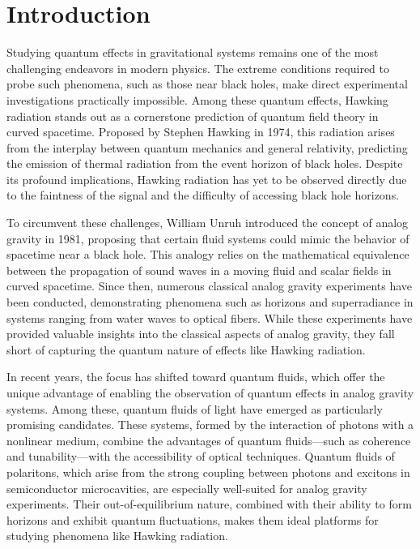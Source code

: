 

\chapter{Introduction}
\label{chap:introduction}

Studying quantum effects in gravitational systems remains one of the most challenging endeavors in modern physics. 
The extreme conditions required to probe such phenomena, such as those near black holes, make direct experimental investigations practically impossible. 
Among these quantum effects, Hawking radiation stands out as a cornerstone prediction of quantum field theory in curved spacetime. Proposed by Stephen Hawking in 1974, this radiation arises from the interplay between quantum mechanics and general relativity, predicting the emission of thermal radiation from the event horizon of black holes. Despite its profound implications, Hawking radiation has yet to be observed directly due to the faintness of the signal and the difficulty of accessing black hole horizons.

To circumvent these challenges, William Unruh introduced the concept of analog gravity in 1981, proposing that certain fluid systems could mimic the behavior of spacetime near a black hole. 
This analogy relies on the mathematical equivalence between the propagation of sound waves in a moving fluid and scalar fields in curved spacetime. 
Since then, numerous classical analog gravity experiments have been conducted, demonstrating phenomena such as horizons and superradiance in systems ranging from water waves to optical fibers. While these experiments have provided valuable insights into the classical aspects of analog gravity, they fall short of capturing the quantum nature of effects like Hawking radiation.

In recent years, the focus has shifted toward quantum fluids, which offer the unique advantage of enabling the observation of quantum effects in analog gravity systems. Among these, quantum fluids of light have emerged as particularly promising candidates. 
These systems, formed by the interaction of photons with a nonlinear medium, combine the advantages of quantum fluids—such as coherence and tunability—with the accessibility of optical techniques. Quantum fluids of polaritons, which arise from the strong coupling between photons and excitons in semiconductor microcavities, are especially well-suited for analog gravity experiments. 
Their out-of-equilibrium nature, combined with their ability to form horizons and exhibit quantum fluctuations, makes them ideal platforms for studying phenomena like Hawking radiation.

